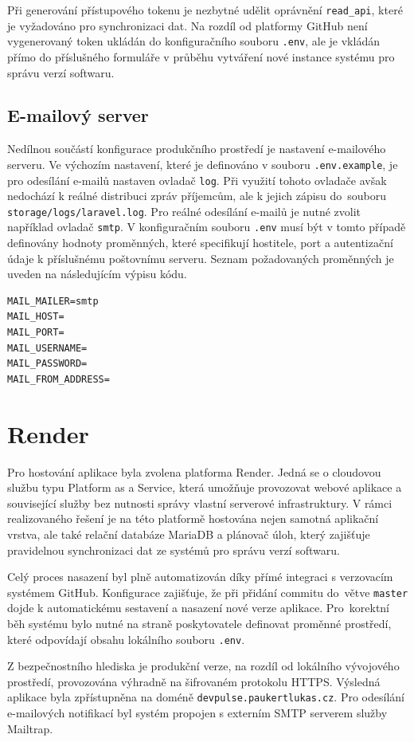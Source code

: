 Při generování přístupového tokenu je nezbytné udělit oprávnění \texttt{read\_api}, které je vyžadováno pro synchronizaci dat. Na rozdíl od platformy GitHub není vygenerovaný token ukládán do konfiguračního souboru \texttt{.env}, ale je vkládán přímo do příslušného formuláře v průběhu vytváření nové instance systému pro správu verzí softwaru.

\subsection{E-mailový server}
Nedílnou součástí konfigurace produkčního prostředí je nastavení e-mailového serveru. Ve výchozím nastavení, které je definováno v souboru \texttt{.env.example}, je pro odesílání e-mailů nastaven ovladač \texttt{log}. Při využití tohoto ovladače avšak nedochází k reálné distribuci zpráv příjemcům, ale k jejich zápisu do~souboru \texttt{storage/logs/laravel.log}. Pro reálné odesílání e-mailů je nutné zvolit například ovladač \texttt{smtp}. V konfiguračním souboru \texttt{.env} musí být v tomto případě definovány hodnoty proměnných, které specifikují hostitele, port a autentizační údaje k příslušnému poštovnímu serveru. Seznam požadovaných proměnných je uveden na následujícím výpisu kódu.

\begin{verbatim}
MAIL_MAILER=smtp
MAIL_HOST=
MAIL_PORT=
MAIL_USERNAME=
MAIL_PASSWORD=
MAIL_FROM_ADDRESS=
\end{verbatim}

\section{Render}
Pro hostování aplikace byla zvolena platforma Render. Jedná se o cloudovou službu typu Platform as a Service, která umožňuje provozovat webové aplikace a související služby bez nutnosti správy vlastní serverové infrastruktury. V rámci realizovaného řešení je na této platformě hostována nejen samotná aplikační vrstva, ale také relační databáze MariaDB a plánovač úloh, který zajišťuje pravidelnou synchronizaci dat ze systémů pro správu verzí softwaru.

Celý proces nasazení byl plně automatizován díky přímé integraci s verzovacím systémem GitHub. Konfigurace zajišťuje, že při přidání commitu do~větve \texttt{master} dojde k automatickému sestavení a nasazení nové verze aplikace. Pro~korektní běh systému bylo nutné na straně poskytovatele definovat proměnné prostředí, které odpovídají obsahu lokálního souboru \texttt{.env}.

Z bezpečnostního hlediska je produkční verze, na rozdíl od lokálního vývojového prostředí, provozována výhradně na šifrovaném protokolu HTTPS. Výsledná aplikace byla zpřístupněna na doméně \texttt{devpulse.paukertlukas.cz}. Pro odesílání e-mailových notifikací byl systém propojen s externím SMTP serverem služby Mailtrap.
